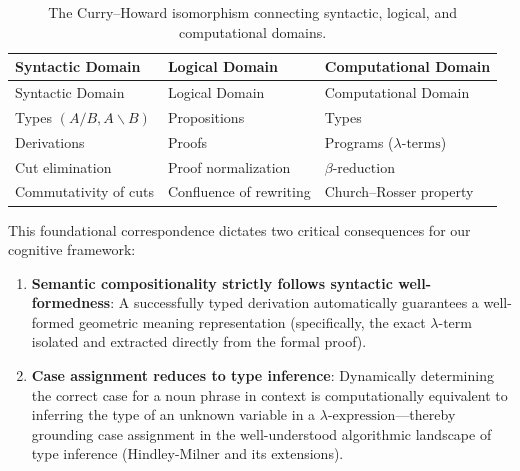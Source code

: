 \documentclass[
]{article}
\providecommand{\tightlist}{%
  \setlength{\itemsep}{0pt}\setlength{\parskip}{0pt}}
\begin{document}
\begin{longtable}[]{@{}
  >{\raggedright\arraybackslash}p{}
  >{\raggedright\arraybackslash}p{}
  >{\raggedright\arraybackslash}p{}@{}}
\caption{The Curry--Howard isomorphism connecting syntactic, logical,
and computational domains.}\label{tbl:curry-howard}\tabularnewline
\toprule\noalign{}
\begin{minipage}[b]{\linewidth}\raggedright
Syntactic Domain
\end{minipage} & \begin{minipage}[b]{\linewidth}\raggedright
Logical Domain
\end{minipage} & \begin{minipage}[b]{\linewidth}\raggedright
Computational Domain
\end{minipage} \\
\midrule\noalign{}
\endfirsthead
\toprule\noalign{}
\begin{minipage}[b]{\linewidth}\raggedright
Syntactic Domain
\end{minipage} & \begin{minipage}[b]{\linewidth}\raggedright
Logical Domain
\end{minipage} & \begin{minipage}[b]{\linewidth}\raggedright
Computational Domain
\end{minipage} \\
\midrule\noalign{}
\endhead
\bottomrule\noalign{}
\endlastfoot
Types \((A / B, A \backslash B)\) & Propositions & Types \\
Derivations & Proofs & Programs (\(\lambda\text{-terms}\)) \\
Cut elimination & Proof normalization & \(\beta\text{-reduction}\) \\
Commutativity of cuts & Confluence of rewriting & Church--Rosser
property \\
\end{longtable}

This foundational correspondence dictates two critical consequences for
our cognitive framework:

\begin{enumerate}
\def\labelenumi{\arabic{enumi}.}
\tightlist
\item
  \textbf{Semantic compositionality strictly follows syntactic
  well-formedness}: A successfully typed derivation automatically
  guarantees a well-formed geometric meaning representation
  (specifically, the exact \(\lambda\text{-term}\) isolated and
  extracted directly from the formal proof).
\item
  \textbf{Case assignment reduces to type inference}: Dynamically
  determining the correct case for a noun phrase in context is
  computationally equivalent to inferring the type of an unknown
  variable in a \(\lambda\text{-expression}\)---thereby grounding case
  assignment in the well-understood algorithmic landscape of type
  inference (Hindley-Milner and its extensions).
\end{enumerate}
\end{document}
